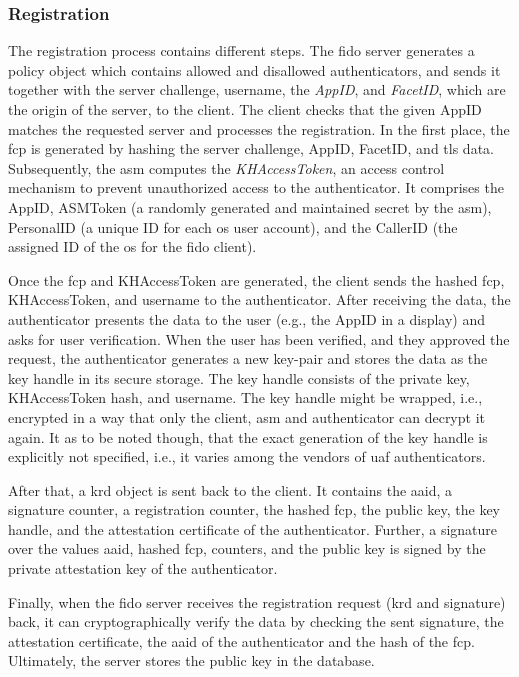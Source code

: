 \subsubsection{Registration}

The registration process contains different steps. The \gls{fido} server generates a policy object which contains allowed and disallowed authenticators, and sends it together with the server challenge, username, the \textit{AppID}, and \textit{FacetID}, which are the origin of the server, to the client. The client checks that the given AppID matches the requested server and processes the registration. In the first place, the \gls{fcp} is generated by hashing the server challenge, AppID, FacetID, and \gls{tls} data. Subsequently, the \gls{asm} computes the \textit{KHAccessToken}, an access control mechanism to prevent unauthorized access to the authenticator. It comprises the AppID, ASMToken (a randomly generated and maintained secret by the \gls{asm}), PersonalID (a unique ID for each \gls{os} user account), and the CallerID (the assigned ID of the \gls{os} for the \gls{fido} client).

Once the \gls{fcp} and KHAccessToken are generated, the client sends the hashed \gls{fcp}, KHAccessToken, and username to the authenticator. After receiving the data, the authenticator presents the data to the user (e.g., the AppID in a display) and asks for user verification. When the user has been verified, and they approved the request, the authenticator generates a new key-pair and stores the data as the key handle in its secure storage. The key handle consists of the private key, KHAccessToken hash, and username. The key handle might be wrapped, i.e., encrypted in a way that only the client, \gls{asm} and authenticator can decrypt it again. It as to be noted though, that the exact generation of the key handle is explicitly not specified, i.e., it varies among the vendors of \gls{uaf} authenticators.

 After that, a \gls{krd} object is sent back to the client. It contains the \gls{aaid}, a signature counter, a registration counter, the hashed \gls{fcp}, the public key, the key handle, and the attestation certificate of the authenticator. Further, a signature over the values \gls{aaid}, hashed \gls{fcp}, counters, and the public key is signed by the private attestation key of the authenticator.

Finally, when the \gls{fido} server receives the registration request (\gls{krd} and signature) back, it can cryptographically verify the data by checking the sent signature, the attestation certificate, the \gls{aaid} of the authenticator and the hash of the \gls{fcp}. Ultimately, the server stores the public key in the database.


